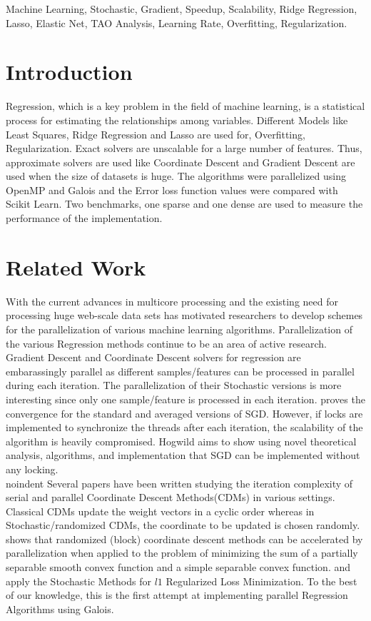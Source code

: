 \documentclass{sigplanconf}
\begin{document}
\keywords
Machine Learning, Stochastic, Gradient, Speedup, Scalability, Ridge Regression, Lasso, Elastic Net, TAO Analysis, Learning Rate, Overfitting, Regularization.

\section{Introduction}
Regression, which is a key problem in the field of machine learning, is a statistical process for estimating the relationships among variables. 
Different Models like Least Squares, Ridge Regression and Lasso are used for, Overfitting, Regularization. 
Exact solvers are unscalable for a large number of features. Thus, approximate solvers are used like Coordinate Descent and Gradient Descent are used 
when the size of datasets is huge. The algorithms were parallelized using OpenMP and Galois and the Error loss function 
values were compared with Scikit Learn. Two benchmarks, one sparse and one dense are used to measure the performance of the implementation.

\section{Related Work}
With the current advances in multicore processing and the existing need for processing huge web-scale data sets has motivated 
researchers to develop schemes for the parallelization of various machine learning algorithms. Parallelization of the various Regression 
methods continue to be an area of active research. Gradient Descent and Coordinate Descent solvers for regression are embarassingly parallel 
as different samples/features can be processed in parallel during each iteration. The parallelization of their Stochastic versions is more
interesting since only one sample/feature is processed in each iteration. \cite{zhang1} proves the convergence for the standard and averaged 
versions of SGD. However, if locks are implemented to synchronize the threads after each iteration, the scalability of the algorithm is heavily
compromised. Hogwild \cite{hogwild} aims to show using novel theoretical analysis, algorithms, and implementation that SGD can be implemented
without any locking. \\
{noindent}
Several papers have been written studying the iteration complexity of serial and parallel Coordinate Descent Methods(CDMs) in various settings.
Classical CDMs update the weight vectors in a cyclic order whereas in Stochastic/randomized CDMs, the coordinate to be updated is chosen randomly.
\cite{pcd1} shows that randomized (block) coordinate descent methods can be accelerated by parallelization when applied to the problem 
of minimizing the sum of a partially separable smooth convex function and a simple separable convex function. 
\cite{tewari} and \cite{shotgun} apply the Stochastic Methods for \begin{math}l1 \end{math} Regularized Loss Minimization. 
To the best of our knowledge, this is the first attempt at implementing parallel Regression Algorithms using Galois.
\end{document}
